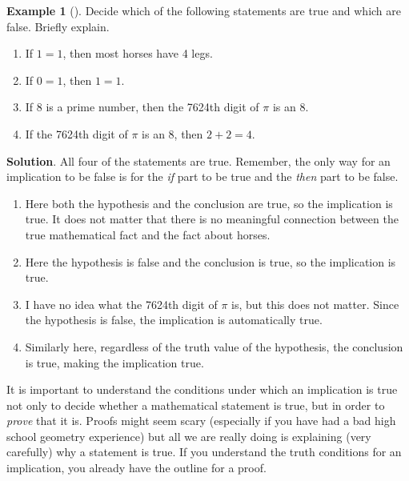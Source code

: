 \documentclass[10pt,]{book}
\theoremstyle{plain}
\theoremstyle{definition}
\theoremstyle{definition}
\newtheorem{example}[theorem]{Example}
\theoremstyle{definition}
\theoremstyle{definition}
\numberwithin{equation}{chapter}
\begin{document}
\begin{example}[]\label{example-32}
\hypertarget{p-1278}{}%
Decide which of the following statements are true and which are false. Briefly explain. \leavevmode%
\begin{enumerate}
\item\hypertarget{li-287}{}\hypertarget{p-1279}{}%
If \(1=1\), then most horses have 4 legs.%
\item\hypertarget{li-288}{}\hypertarget{p-1280}{}%
If \(0=1\), then \(1=1\).%
\item\hypertarget{li-289}{}\hypertarget{p-1281}{}%
If 8 is a prime number, then the 7624th digit of \(\pi\) is an 8.%
\item\hypertarget{li-290}{}\hypertarget{p-1282}{}%
If the 7624th digit of \(\pi\) is an 8, then \(2+2 = 4\).%
\end{enumerate}
%
\par\smallskip%
\noindent\textbf{Solution}.\hypertarget{solution-117}{}\quad%
\hypertarget{p-1283}{}%
All four of the statements are true. Remember, the only way for an implication to be false is for the \emph{if} part to be true and the \emph{then} part to be false. \leavevmode%
\begin{enumerate}
\item\hypertarget{li-291}{}\hypertarget{p-1284}{}%
Here both the hypothesis and the conclusion are true, so the implication is true. It does not matter that there is no meaningful connection between the true mathematical fact and the fact about horses.%
\item\hypertarget{li-292}{}\hypertarget{p-1285}{}%
Here the hypothesis is false and the conclusion is true, so the implication is true.%
\item\hypertarget{li-293}{}\hypertarget{p-1286}{}%
I have no idea what the 7624th digit of \(\pi\) is, but this does not matter. Since the hypothesis is false, the implication is automatically true.%
\item\hypertarget{li-294}{}\hypertarget{p-1287}{}%
Similarly here, regardless of the truth value of the hypothesis, the conclusion is true, making the implication true.%
\end{enumerate}
%
\end{example}
\hypertarget{p-1288}{}%
It is important to understand the conditions under which an implication is true not only to decide whether a mathematical statement is true, but in order to \emph{prove} that it is. Proofs might seem scary (especially if you have had a bad high school geometry experience) but all we are really doing is explaining (very carefully) why a statement is true. If you understand the truth conditions for an implication, you already have the outline for a proof.%
\end{document}
